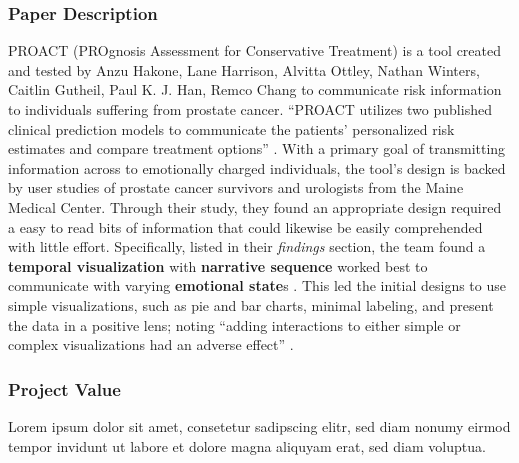 \documentclass[journal]{vgtc}                %
\begin{document}
        \subsubsection{Paper Description}
        PROACT (PROgnosis Assessment for Conservative Treatment) is a tool created and tested by Anzu Hakone, Lane Harrison, Alvitta Ottley, Nathan Winters, Caitlin Gutheil, Paul K. J. Han, Remco Chang to communicate risk information to individuals suffering from prostate cancer.
        ``PROACT utilizes two published clinical prediction models to communicate the patients’ personalized risk estimates and compare treatment options'' \cite[p.~1]{PROACT:2016}.
        With a primary goal of transmitting information across to emotionally charged individuals, the tool's design is backed by user studies of prostate cancer survivors and urologists from the Maine Medical Center.
        Through their study, they found an appropriate design required a easy to read bits of information that could likewise be easily comprehended with little effort.
        Specifically, listed in their \textit{findings} section, the team found a \textbf{temporal visualization} with \textbf{narrative sequence} worked best to communicate with varying \textbf{emotional state}s \cite[p.~8]{PROACT:2016}.
        This led the initial designs to use simple visualizations, such as pie and bar charts, minimal labeling, and present the data in a positive lens; noting ``adding interactions to either simple or complex visualizations had an adverse effect'' \cite[p.~2]{PROACT:2016}.

        \subsubsection{Project Value}
        Lorem ipsum dolor sit amet, consetetur sadipscing elitr, sed diam nonumy eirmod tempor invidunt ut labore et dolore magna aliquyam erat, sed diam voluptua.
\end{document}
